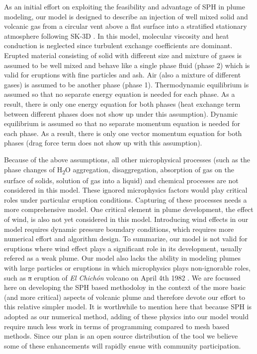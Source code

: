 \documentclass[gmd, manuscript]{copernicus} %
\providecommand{\DIFadd}[1]{{\protect\color{blue}\uwave{#1}}} %
\providecommand{\DIFdel}[1]{{\protect\color{red}\sout{#1}}}                      %
\providecommand{\DIFaddbegin}{} %
\providecommand{\DIFaddend}{} %
\providecommand{\DIFdelbegin}{} %
\providecommand{\DIFdelend}{} %
\begin{document}
As an initial effort on exploiting the feasibility and advantage of SPH in plume modeling, our model is designed to describe an injection of well mixed solid and volcanic gas from a circular vent above a flat surface into a stratified stationary atmosphere following SK-3D \citep{suzuki2005numerical}. In this model, molecular viscosity and heat conduction is neglected since turbulent exchange coefficients are dominant. Erupted material consisting of solid with different size and mixture of gases is assumed to be well mixed and behave like a single phase fluid (phase 2) which is valid for eruptions with fine particles and ash. Air (also a mixture of different gases) is assumed to be another phase (phase 1). Thermodynamic equilibrium is assumed so that no separate energy equation is needed for each phase. As a result, there is only one energy equation for both phases (heat exchange term between different phases does not show up under this assumption). Dynamic equilibrium is assumed so that no separate momentum equation is needed for each phase. As a result, there is only one vector momentum equation for both phases (drag force term does not show up with this assumption). 

Because of the above assumptions, all other microphysical processes (such as the phase changes of \texorpdfstring{H\textsubscript{2}O}, aggregation, disaggregation, absorption of gas on the surface of solids, solution of gas into a liquid) and chemical processes are not considered in this model. These ignored microphysics factors would play critical roles under particular eruption conditions. Capturing of these processes needs a more comprehensive model. One critical element in plume development, the effect of wind, is also not yet considered in this model. Introducing wind effects in our model requires dynamic pressure boundary conditions, which requires more numerical effort and algorithm design. To summarize, our model is not valid for eruptions where wind effect plays a significant role in its development, usually refered as a weak plume. Our model also lacks the ability in modeling plumes with large particles or eruptions in which microphysics plays non-ignorable roles, such as \DIFdelbegin \DIFdel{a }\DIFdelend \DIFaddbegin \DIFadd{an }\DIFaddend eruption of \textit{El Chich{\'o}n} volcano on April 4th 1982 \citep{sigurdsson19841982, folch2016fplume}. We are focussed here on developing the SPH based methodoloy in the context of the more basic (and more critical) aspects of volcanic plume and therefore devote our effort to this relative simpler model. It is worthwhile to mention here that because SPH is adopted as our numerical method, adding of these physics into our model would require much less work in terms of programming compared to mesh based methods. Since our plan is an open source distribution of the tool we believe some of these enhancements will rapidly ensue with community participation.
\end{document}

